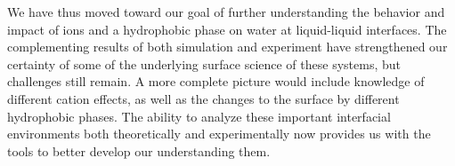 We have thus moved toward our goal of further understanding the behavior and impact of ions and a hydrophobic phase on water at liquid-liquid interfaces. The complementing results of both simulation and experiment have strengthened our certainty of some of the underlying surface science of these systems, but challenges still remain. A more complete picture would include knowledge of different cation effects, as well as the changes to the surface by different hydrophobic phases. The ability to analyze these important interfacial environments both theoretically and experimentally now provides us with the tools to better develop our understanding them.


